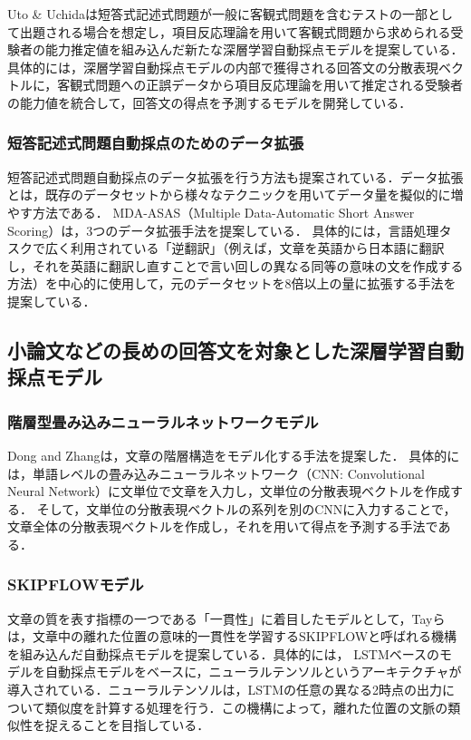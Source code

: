\documentclass[a4paper,12pt,oneside,openany]{jsbook}
\begin{document}
Uto \& Uchida\cite{uchida}\cite{uchida2}は短答式記述式問題が一般に客観式問題を含むテストの一部として出題される場合を想定し，項目反応理論\cite{IRT1}を用いて客観式問題から求められる受験者の能力推定値を組み込んだ新たな深層学習自動採点モデルを提案している．具体的には，深層学習自動採点モデルの内部で獲得される回答文の分散表現ベクトルに，客観式問題への正誤データから項目反応理論を用いて推定される受験者の能力値を統合して，回答文の得点を予測するモデルを開発している．

\subsubsection*{短答記述式問題自動採点のためのデータ拡張}

短答記述式問題自動採点のデータ拡張を行う方法も提案されている．データ拡張とは，既存のデータセットから様々なテクニックを用いてデータ量を擬似的に増やす方法である．
MDA-ASAS（Multiple Data-Automatic Short Answer Scoring）\cite{asag10}は，3つのデータ拡張手法を提案している．
具体的には，言語処理タスクで広く利用されている「逆翻訳」（例えば，文章を英語から日本語に翻訳し，それを英語に翻訳し直すことで言い回しの異なる同等の意味の文を作成する方法）を中心的に使用して，元のデータセットを8倍以上の量に拡張する手法を提案している．

\subsection*{小論文などの長めの回答文を対象とした深層学習自動採点モデル}\label{sec:other_aes}

\subsubsection*{階層型畳み込みニューラルネットワークモデル}

Dong and Zhang\cite{HierarchicalModel}は，文章の階層構造をモデル化する手法を提案した．
具体的には，単語レベルの畳み込みニューラルネットワーク（CNN: Convolutional Neural Network）に文単位で文章を入力し，文単位の分散表現ベクトルを作成する．
そして，文単位の分散表現ベクトルの系列を別のCNNに入力することで，文章全体の分散表現ベクトルを作成し，それを用いて得点を予測する手法である．

\subsubsection*{SKIPFLOWモデル}

文章の質を表す指標の一つである「一貫性」に着目したモデルとして，Tayら\cite{SKIPFLOWmodel}は，文章中の離れた位置の意味的一貫性を学習するSKIPFLOWと呼ばれる機構を組み込んだ自動採点モデルを提案している．具体的には， LSTMベースのモデルを自動採点モデルをベースに，ニューラルテンソルというアーキテクチャが導入されている．ニューラルテンソルは，LSTMの任意の異なる2時点の出力について類似度を計算する処理を行う．この機構によって，離れた位置の文脈の類似性を捉えることを目指している．
\end{document}
